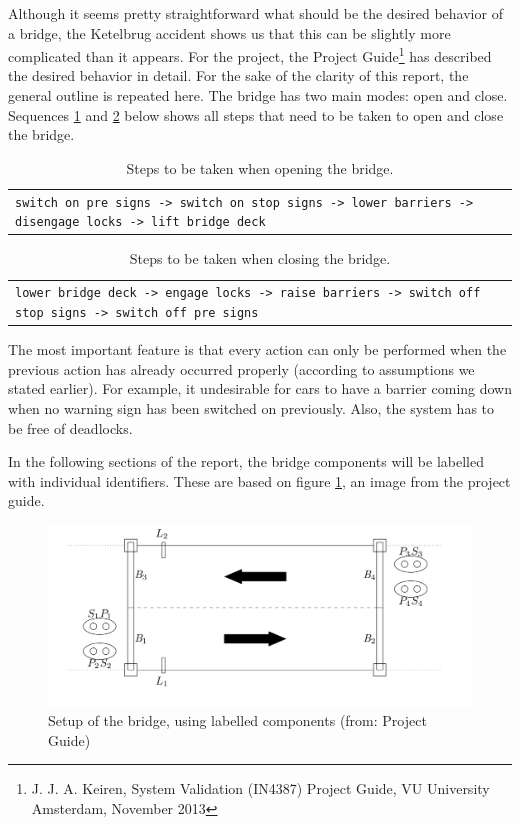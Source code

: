 Although it seems pretty straightforward what should be the desired behavior of a bridge, the Ketelbrug accident shows us that this can be slightly more complicated than it appears. For the project, the Project Guide\footnote{J. J. A. Keiren, System Validation (IN4387) Project Guide, VU University Amsterdam, November 2013} has described the desired behavior in detail. For the sake of the clarity of this report, the general outline is repeated here. The bridge has two main modes: open and close. Sequences \ref{tab:open} and \ref{tab:close} below shows all steps that need to be taken to open and close the bridge.
%
\begin{table}[h]%
\begin{tabular}{l}
	\footnotesize
	\texttt{switch on pre signs -> switch on stop signs -> lower barriers -> disengage locks -> lift bridge deck}\\
\end{tabular}
\caption{Steps to be taken when opening the bridge.}
\label{tab:open}
\end{table}
%
\begin{table}[h]%
\begin{tabular}{l}
	\footnotesize
	\texttt{lower bridge deck -> engage locks -> raise barriers -> switch off stop signs -> switch off pre signs}\\
\end{tabular}
\caption{Steps to be taken when closing the bridge.}
\label{tab:close}
\end{table}
%
The most important feature is that every action can only be performed when the previous action has already occurred properly (according to assumptions we stated earlier). For example, it undesirable for cars to have a barrier coming down when no warning sign has been switched on previously. Also, the system has to be free of deadlocks.

In the following sections of the report, the bridge components will be labelled with individual identifiers. These are based on figure \ref{fig:setup}, an image from the project guide.
%
\begin{figure}[htb]%
\includegraphics[width=\columnwidth]{Images/Setup.png}%
\caption{Setup of the bridge, using labelled components (from: Project Guide)}%
\label{fig:setup}%
\end{figure}
%

\newpage
